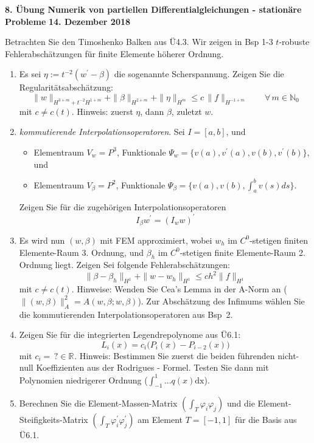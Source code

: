 \documentclass[11pt,a4paper]{report}
\newcommand{\R}[1]{\mathbb{R}^{#1}}
\begin{document}
\begin{center}
\textbf{8. \"Ubung Numerik von partiellen Differentialgleichungen - station\"are Probleme} \newline 
\textbf{14. Dezember 2018}
\end{center}
Betrachten Sie den Timoshenko Balken aus \"U4.3. Wir zeigen in Bsp 1-3
$t$-robuste Fehlerabsch\"atzungen f\"ur finite Elemente h\"oherer Ordnung.

\begin{enumerate}

\item Es sei $\eta := t^{-2} (w^\prime - \beta)$ die sogenannte
  Scherspannung. Zeigen Sie die Regularit\"atsabsch\"atzung:
$$
\| w \|_{H^{3+m} + t^{-2} H^{1+m}} + \| \beta \|_{H^{2+m}} + \| \eta \|_{H^m}
\le c \, \| f \|_{H^{-1+m}} \qquad \forall \, m \in  \mathbb{N}_0
$$
mit $c \neq c(t)$. Hinweis: zuerst $\eta$, dann $\beta$, zuletzt $w$.

\item {\em kommutierende Interpolationsoperatoren}. Sei $I = [a,b]$,
  und
\begin{itemize}
\item
Elementraum $V_w = P^3$, Funktionale $\Psi_w = \{ v(a),
v^\prime(a), v(b), v^\prime(b) \}$, und
\item
Elementraum $V_\beta = P^2$, Funktionale $\Psi_\beta = \{ v(a), v(b),
\int_a^b v(s) ds \}$.
\end{itemize}
Zeigen Sie f\"ur die zugeh\"origen Interpolationsoperatoren 
$$
I_\beta w^\prime = (I_w w)^\prime
$$

\item Es wird nun $(w,\beta)$ mit FEM approximiert, wobei $w_h$ im $C^0$-stetigen finiten Elemente-Raum
  3. Ordnung, und $\beta_h$ im $C^0$-stetigen finite Elemente-Raum
  2. Ordnung liegt. Zeigen Sei folgende Fehlerabsch\"atzungen:
$$
\| \beta - \beta_h \|_{H^1} + \| w - w_h \|_{H^1}\leq c h^2 \| f \|_{H^1}
$$
mit $c \neq c(t)$.
Hinweise: Wenden Sie Cea's Lemma in der A-Norm an ($\|(w,\beta)\|_A^2 =
A(w,\beta; w, \beta)$). Zur Absch\"atzung
des Infimums w\"ahlen Sie die kommutierenden Interpolationsoperatoren
aus Bsp~2. 

\item Zeigen Sie f\"ur die integrierten Legendrepolynome aus \"U6.1:
$$
L_i(x) = c_i \big(  P_i(x) - P_{i-2} (x) \big)
$$
mit $c_i = \, ? \in \R{}$. Hinweis: Bestimmen Sie zuerst die beiden f\"uhrenden
nicht-null Koeffizienten aus der Rodrigues  - Formel. Testen Sie dann
mit Polynomien niedrigerer Ordnung ($\int_{-1}^1 ... q(x) \text{dx}$). 

\item Berechnen Sie die Element-Massen-Matrix $(\int_T \varphi_i
  \varphi_j )$ und die Element-Steifigkeits-Matrix $(\int_T \varphi_i^\prime
  \varphi_j^\prime )$ am Element $T = [-1,1]$ f\"ur die Basis
  aus \"U6.1. 




\end{enumerate}
\end{document}
